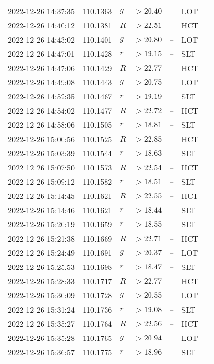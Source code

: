 \documentclass{nature_plusfigure}
\begin{document}
\begin{supplement}
\begin{center}
\begin{longtable}{lllllll}
2022-12-26 14:37:35 & 110.1363 & $g$ & $>20.40$ & -- & LOT &  \\ 
2022-12-26 14:40:12 & 110.1381 & $R$ & $>22.51$ & -- & HCT &  \\ 
2022-12-26 14:43:02 & 110.1401 & $g$ & $>20.80$ & -- & LOT &  \\ 
2022-12-26 14:47:01 & 110.1428 & $r$ & $>19.15$ & -- & SLT &  \\ 
2022-12-26 14:47:06 & 110.1429 & $R$ & $>22.77$ & -- & HCT &  \\ 
2022-12-26 14:49:08 & 110.1443 & $g$ & $>20.75$ & -- & LOT &  \\ 
2022-12-26 14:52:35 & 110.1467 & $r$ & $>19.19$ & -- & SLT &  \\ 
2022-12-26 14:54:02 & 110.1477 & $R$ & $>22.72$ & -- & HCT &  \\ 
2022-12-26 14:58:06 & 110.1505 & $r$ & $>18.81$ & -- & SLT &  \\ 
2022-12-26 15:00:56 & 110.1525 & $R$ & $>22.85$ & -- & HCT &  \\ 
2022-12-26 15:03:39 & 110.1544 & $r$ & $>18.63$ & -- & SLT &  \\ 
2022-12-26 15:07:50 & 110.1573 & $R$ & $>22.54$ & -- & HCT &  \\ 
2022-12-26 15:09:12 & 110.1582 & $r$ & $>18.51$ & -- & SLT &  \\ 
2022-12-26 15:14:45 & 110.1621 & $R$ & $>22.55$ & -- & HCT &  \\ 
2022-12-26 15:14:46 & 110.1621 & $r$ & $>18.44$ & -- & SLT &  \\ 
2022-12-26 15:20:19 & 110.1659 & $r$ & $>18.55$ & -- & SLT &  \\ 
2022-12-26 15:21:38 & 110.1669 & $R$ & $>22.71$ & -- & HCT &  \\ 
2022-12-26 15:24:49 & 110.1691 & $g$ & $>20.37$ & -- & LOT &  \\ 
2022-12-26 15:25:53 & 110.1698 & $r$ & $>18.47$ & -- & SLT &  \\ 
2022-12-26 15:28:33 & 110.1717 & $R$ & $>22.77$ & -- & HCT &  \\ 
2022-12-26 15:30:09 & 110.1728 & $g$ & $>20.55$ & -- & LOT &  \\ 
2022-12-26 15:31:24 & 110.1736 & $r$ & $>19.08$ & -- & SLT &  \\ 
2022-12-26 15:35:27 & 110.1764 & $R$ & $>22.56$ & -- & HCT &  \\ 
2022-12-26 15:35:28 & 110.1765 & $g$ & $>20.94$ & -- & LOT &  \\ 
2022-12-26 15:36:57 & 110.1775 & $r$ & $>18.96$ & -- & SLT &  \\ 

\end{longtable}
\end{center}
\end{supplement}
\end{document}
